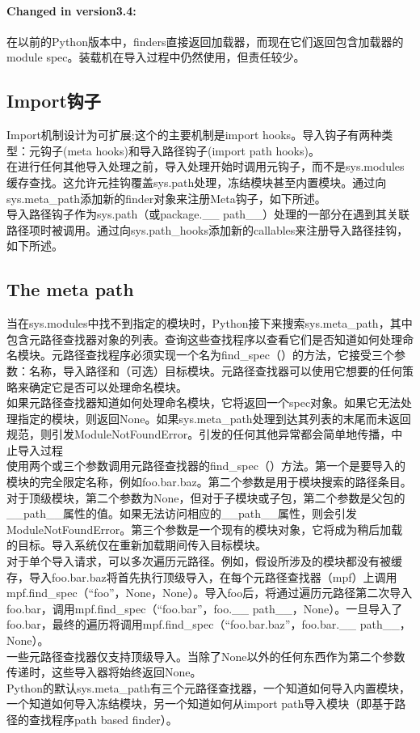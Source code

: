 \documentclass[10pt,UTF8]{ctexart}
\begin{document}
\paragraph{Changed in version3.4:}在以前的Python版本中，finders直接返回加载器，而现在它们返回包含加载器的module spec。装载机在导入过程中仍然使用，但责任较少。

\subsection{Import钩子}
Import机制设计为可扩展;这个的主要机制是import hooks。导入钩子有两种类型：元钩子(meta hooks)和导入路径钩子(import path hooks)。\\
\indent 在进行任何其他导入处理之前，导入处理开始时调用元钩子，而不是sys.modules缓存查找。这允许元挂钩覆盖sys.path处理，冻结模块甚至内置模块。通过向sys.meta_path添加新的finder对象来注册Meta钩子，如下所述。\\
\indent 导入路径钩子作为sys.path（或package.__ path__）处理的一部分在遇到其关联路径项时被调用。通过向sys.path_hooks添加新的callables来注册导入路径挂钩，如下所述。
\subsection{The meta path}
当在sys.modules中找不到指定的模块时，Python接下来搜索sys.meta_path，其中包含元路径查找器对象的列表。查询这些查找程序以查看它们是否知道如何处理命名模块。元路径查找程序必须实现一个名为find_spec（）的方法，它接受三个参数：名称，导入路径和（可选）目标模块。元路径查找器可以使用它想要的任何策略来确定它是否可以处理命名模块。\\
\indent 如果元路径查找器知道如何处理命名模块，它将返回一个spec对象。如果它无法处理指定的模块，则返回None。如果sys.meta_path处理到达其列表的末尾而未返回规范，则引发ModuleNotFoundError。引发的任何其他异常都会简单地传播，中止导入过程\\
\indent 使用两个或三个参数调用元路径查找器的find_spec（）方法。第一个是要导入的模块的完全限定名称，例如foo.bar.baz。第二个参数是用于模块搜索的路径条目。对于顶级模块，第二个参数为None，但对于子模块或子包，第二个参数是父包的__path__属性的值。如果无法访问相应的__path__属性，则会引发ModuleNotFoundError。第三个参数是一个现有的模块对象，它将成为稍后加载的目标。导入系统仅在重新加载期间传入目标模块。\\
\indent 对于单个导入请求，可以多次遍历元路径。例如，假设所涉及的模块都没有被缓存，导入foo.bar.baz将首先执行顶级导入，在每个元路径查找器（mpf）上调用mpf.find_spec（“foo”，None，None）。导入foo后，将通过遍历元路径第二次导入foo.bar，调用mpf.find_spec（“foo.bar”，foo.__ path__，None）。一旦导入了foo.bar，最终的遍历将调用mpf.find_spec（“foo.bar.baz”，foo.bar.__ path__，None）。\\
\indent 一些元路径查找器仅支持顶级导入​​。当除了None以外的任何东西作为第二个参数传递时，这些导入器将始终返回None。\\
\indent Python的默认sys.meta_path有三个元路径查找器，一个知道如何导入内置模块，一个知道如何导入冻结模块，另一个知道如何从import path导入模块（即基于路径的查找程序path based finder）。
\end{document}
